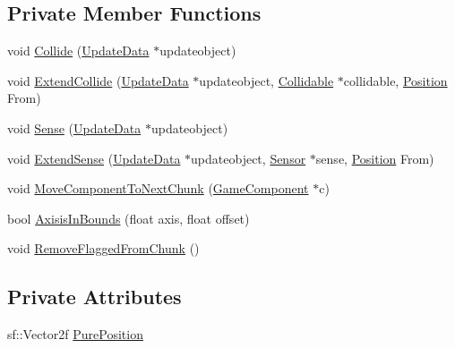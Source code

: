 \subsection*{Private Member Functions}
\begin{DoxyCompactItemize}
\item 
void \hyperlink{class_chunk_a85f10ca606a2cf0eaf3f760ff0748282}{Collide} (\hyperlink{class_update_data}{Update\-Data} $\ast$updateobject)
\item 
void \hyperlink{class_chunk_a2364bb0e89fae7c80d101388ffe84831}{Extend\-Collide} (\hyperlink{class_update_data}{Update\-Data} $\ast$updateobject, \hyperlink{class_collidable}{Collidable} $\ast$collidable, \hyperlink{_chunk_8hpp_ab91b34ae619fcdfcba4522b4f335bf83}{Position} From)
\item 
void \hyperlink{class_chunk_a23684bfafa76cadb95c81ba89b039461}{Sense} (\hyperlink{class_update_data}{Update\-Data} $\ast$updateobject)
\item 
void \hyperlink{class_chunk_aaa36053121ed2f73056ce8adf4586484}{Extend\-Sense} (\hyperlink{class_update_data}{Update\-Data} $\ast$updateobject, \hyperlink{class_sensor}{Sensor} $\ast$sense, \hyperlink{_chunk_8hpp_ab91b34ae619fcdfcba4522b4f335bf83}{Position} From)
\item 
void \hyperlink{class_chunk_a749ea52ccf2c2905408c35e43545b6e0}{Move\-Component\-To\-Next\-Chunk} (\hyperlink{class_game_component}{Game\-Component} $\ast$c)
\item 
bool \hyperlink{class_chunk_aae4f8da15c8d73f2c6da55642aa8ca72}{Axisis\-In\-Bounds} (float axis, float offset)
\item 
void \hyperlink{class_chunk_aa7f84e97b0fd555faeb811c747a6d26d}{Remove\-Flagged\-From\-Chunk} ()
\end{DoxyCompactItemize}
\subsection*{Private Attributes}
\begin{DoxyCompactItemize}
\item 
sf\-::\-Vector2f \hyperlink{class_chunk_ace1577872b1189bc7fd88a9b3817ce98}{Pure\-Position}
\end{DoxyCompactItemize}


